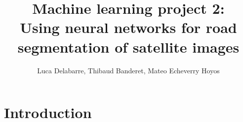 \documentclass[10pt,conference,compsocconf]{IEEEtran}
\begin{document}
\title{\Large{Machine learning project 2:\\
Using neural networks for road segmentation of satellite images}}

\author{Luca Delabarre, Thibaud Banderet, Mateo Echeverry Hoyos}

\maketitle

\begin{abstract}
\end{abstract}

\section{Introduction}


\end{document}
